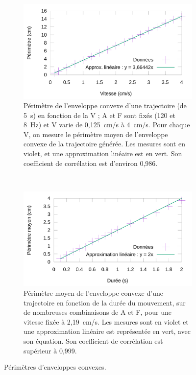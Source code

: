 	\begin{figure}[!htbp]
		\begin{subfigure}{0.49\textwidth}
			\centering
			\includegraphics[width=\textwidth]{figures/ch4/areaVspeed}
			\caption[Périmètre de l'enveloppe convexe en fonction de la vitesse]{Périmètre de l'enveloppe convexe d'une trajectoire (de 5~s) en fonction de la V ; A et F sont fixés (120\textdegree{} et 8~Hz) et V varie de 0,125~cm/s à 4~cm/s. Pour chaque V, on mesure le périmètre moyen de l'enveloppe convexe de la trajectoire générée. Les mesures sont en violet, et une approximation linéaire est en vert. Son coefficient de corrélation est d'environ 0,986.}
			\label{fig:avspeed}
		\end{subfigure}
		~
		\begin{subfigure}{0.49\textwidth}
			\centering
			\includegraphics[width=\textwidth]{figures/ch4/durationVarea}
			\caption[Périmètre de l'enveloppe convexe sur en fonction de la durée du mouvement]{Périmètre moyen de l'enveloppe convexe d'une trajectoire en fonction de la durée du mouvement, sur de nombreuses combinaisons de A et F, pour une vitesse fixée à 2,19~cm/s. Les mesures sont en violet et une approximation linéaire est représentée en vert, avec son équation. Son coefficient de corrélation est supérieur à 0,999.}
			\label{fig:durationVarea}
		\end{subfigure}
		\caption{Périmètres d'enveloppes convexes.}
		\label{fig:perimeters}
	\end{figure}
	
